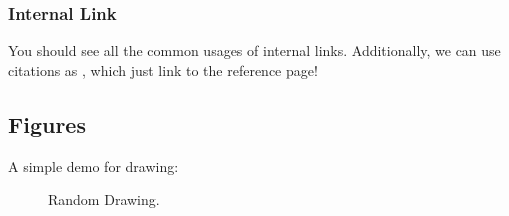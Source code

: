 \subsubsection{Internal Link}
You should see all the common usages of internal links. Additionally, we can use citations as \cite{newton1726philosophiae}, which just link
to the reference page!

\subsection{Figures}
A simple demo for drawing:
\begin{figure}[H]
	\centering
	\caption[Caption]{Random Drawing.\footnotemark}
	\label{fig:test}
\end{figure}
